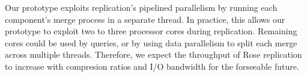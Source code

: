 \documentclass{vldb}
\newcommand{\rows}{Rose\xspace}
\newcommand{\rowss}{Rose's\xspace}
\begin{document}
Our prototype exploits replication's pipelined parallelism by running
each component's merge process in a separate thread.  In practice,
this allows our prototype to exploit two to three processor cores
during replication.  Remaining cores could be used by queries, or
by using data parallelism to split each merge across multiple threads.
Therefore, we expect the throughput of \rows replication to increase
with compresion ratios and I/O bandwidth for the forseeable future.





\end{document}

